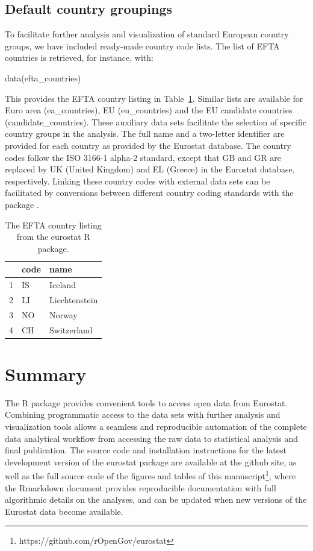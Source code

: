 \subsection{Default country groupings}

To facilitate further analysis and visualization of standard European
country groups, we have included ready-made country code lists. The
list of EFTA countries is retrieved, for instance, with:

\begin{example}
data(efta_countries)
\end{example}


This provides the EFTA country listing in
Table~\ref{tab:efta}. Similar lists are available for Euro area
(ea\_countries), EU (eu\_countries) and the EU candidate countries
(candidate\_countries). These auxiliary data sets facilitate the
selection of specific country groups in the analysis. The full name
and a two-letter identifier are provided for each country as provided
by the Eurostat database. The country codes follow the ISO 3166-1
alpha-2 standard, except that GB and GR are replaced by UK (United
Kingdom) and EL (Greece) in the Eurostat database,
respectively. Linking these country codes with external data sets can
be facilitated by conversions between different country coding
standards with the  package \citep{countrycode}.

\begin{table}[b]
\centering
\begin{tabular}{rll}
\toprule
  \hline
  & code & name \\ 
  \hline
  1 & IS & Iceland \\ 
  2 & LI & Liechtenstein \\ 
  3 & NO & Norway \\ 
  4 & CH & Switzerland \\ 
   \hline
\bottomrule   
\end{tabular}
\caption{The EFTA country listing from the eurostat R package.}
\label{tab:efta}
\end{table}




\section{Summary}

The  R package provides convenient tools to access open data
from Eurostat. Combining programmatic access to the data sets with
further analysis and visualization tools allows a seamless and
reproducible automation of the complete data analytical workflow from
accessing the raw data to statistical analysis and final
publication. The source code and installation instructions for the
latest development version of the eurostat package are available at
the github site, as well as the full source code of the figures and
tables of this manuscript\footnote{https://github.com/rOpenGov/eurostat},
where the Rmarkdown document provides reproducible documentation with
full algorithmic details on the analyses, and can be updated when new
versions of the Eurostat data become available.

